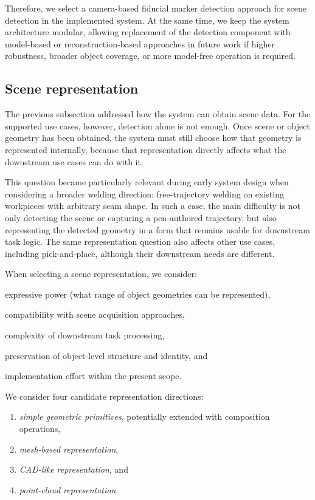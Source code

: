 Therefore, we select a camera-based fiducial marker detection approach for scene detection in the implemented system. At the same time, we keep the system architecture modular, allowing replacement of the detection component with model-based or reconstruction-based approaches in future work if higher robustness, broader object coverage, or more model-free operation is required.


\subsection{Scene representation} \label{subsec:ch2_analysis_scene_representation}

The previous subsection addressed how the system can obtain scene data. For the supported use cases, however, detection alone is not enough. Once scene or object geometry has been obtained, the system must still choose how that geometry is represented internally, because that representation directly affects what the downstream use cases can do with it.

This question became particularly relevant during early system design when considering a broader welding direction: free-trajectory welding on existing workpieces with arbitrary seam shape. In such a case, the main difficulty is not only detecting the scene or capturing a pen-authored trajectory, but also representing the detected geometry in a form that remains usable for downstream task logic. The same representation question also affects other use cases, including pick-and-place, although their downstream needs are different.

When selecting a scene representation, we consider:
\begin{enumerate*}[label=(\roman*)]
    \item expressive power (what range of object geometries can be represented),
    \item compatibility with scene acquisition approaches,
    \item complexity of downstream task processing,
    \item preservation of object-level structure and identity, and
    \item implementation effort within the present scope.
\end{enumerate*}

We consider four candidate representation directions:
\begin{enumerate}[label=(\roman*), itemsep=0.2em]
    \item \emph{simple geometric primitives}, potentially extended with composition operations,
    \item \emph{mesh-based representation},
    \item \emph{CAD-like representation}, and
    \item \emph{point-cloud representation}.
\end{enumerate}

